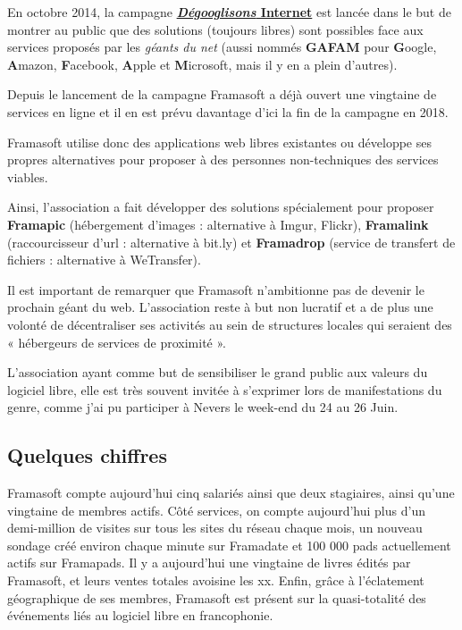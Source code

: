 \documentclass[10pt,a4paper]{report}
\begin{document}
	En octobre 2014, la campagne \href{https://degooglisons-internet.org/}{\textbf{\textit{Dégooglisons} Internet}} est lancée dans le but de montrer au public que des solutions (toujours libres) sont possibles face aux services proposés par les \textit{géants du net} (aussi nommés \textbf{GAFAM} pour \textbf{G}oogle, \textbf{A}mazon, \textbf{F}acebook, \textbf{A}pple et \textbf{M}icrosoft, mais il y en a plein d'autres).
	
	Depuis le lancement de la campagne Framasoft a déjà ouvert une vingtaine de services en ligne et il en est prévu davantage d'ici la fin de la campagne en 2018.
	
	Framasoft utilise donc des applications web libres existantes ou développe ses propres alternatives pour proposer à des personnes non-techniques des services viables.
	
	Ainsi, l'association a fait développer des solutions spécialement pour proposer \textbf{Framapic} (hébergement d'images : alternative à Imgur, Flickr), \textbf{Framalink} (raccourcisseur d'url : alternative à bit.ly) et \textbf{Framadrop} (service de transfert de fichiers : alternative à WeTransfer).
	
	Il est important de remarquer que Framasoft n'ambitionne pas de devenir le prochain géant du web. L'association reste à but non lucratif et a de plus une volonté de décentraliser ses activités au sein de structures locales qui seraient des « hébergeurs de services de proximité ».
	
	L'association ayant comme but de sensibiliser le grand public aux valeurs du logiciel libre, elle est très souvent invitée à s'exprimer lors de manifestations du genre, comme j'ai pu participer à Nevers le week-end du 24 au 26 Juin.
	
	\subsection{Quelques chiffres}
	Framasoft compte aujourd'hui cinq salariés ainsi que deux stagiaires, ainsi qu'une vingtaine de membres actifs. Côté services, on compte aujourd'hui plus d'un demi-million de visites sur tous les sites du réseau chaque mois, un nouveau sondage créé environ chaque minute sur Framadate et 100 000 pads actuellement actifs sur Framapads. Il y a aujourd'hui une vingtaine de livres édités par Framasoft, et leurs ventes totales avoisine les xx. Enfin, grâce à l'éclatement géographique de ses membres, Framasoft est présent sur la quasi-totalité des événements liés au logiciel libre en francophonie.
	
\end{document}
